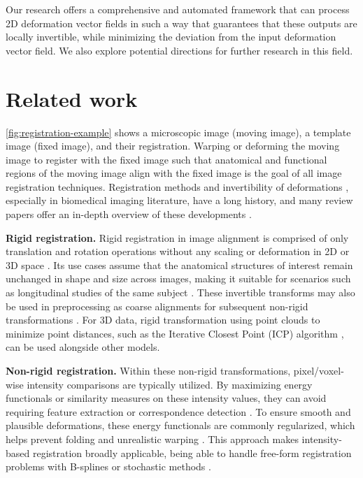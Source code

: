 Our research offers a comprehensive and automated framework that can process 2D deformation vector fields in such a way that guarantees that these outputs are locally invertible, while minimizing the deviation from the input deformation vector field. We also explore potential directions for further research in this field. 


\section{Related work}
\label{sec:related_work}

\autoref{fig:registration-example} shows a microscopic image (moving image), a template image (fixed image), and their registration. Warping or deforming the moving image to register with the fixed image such that anatomical and functional regions of the moving image align with the fixed image is the goal of all image registration techniques. Registration methods and invertibility of deformations \cite{Dupuis1998}, especially in biomedical imaging literature, have a long history, and many review papers offer an in-depth overview of these developments \cite{KLEIN2009786}.

\textbf{Rigid registration.}
Rigid registration in image alignment is comprised of only translation and rotation operations without any scaling or deformation in 2D or 3D space \cite{Zhang1994IterativePM}. Its use cases assume that the anatomical structures of interest remain unchanged in shape and size across images, making it suitable for scenarios such as longitudinal studies of the same subject \cite{REUTER20101181}. These invertible transforms may also be used in preprocessing as coarse alignments for subsequent non-rigid transformations \cite{Frackowiak2004-yy}. For 3D data, rigid transformation using point clouds to minimize point distances, such as the Iterative Closest Point (ICP) algorithm 
\cite{Zhang1994IterativePM}, can be used alongside other models.

\textbf{Non-rigid registration.}
Within these non-rigid transformations, pixel/voxel-wise intensity comparisons are typically utilized. By maximizing energy functionals or similarity measures on these intensity values, they can avoid requiring feature extraction or correspondence detection \cite{regreviewsong}. To ensure smooth and plausible deformations, these energy functionals are commonly regularized, which helps prevent folding and unrealistic warping \cite{Reithmeir2024}. This approach makes intensity-based registration broadly applicable, being able to handle free-form registration problems with B-splines \cite{Rueckert1999} or stochastic methods \cite{Tustison2009}.

